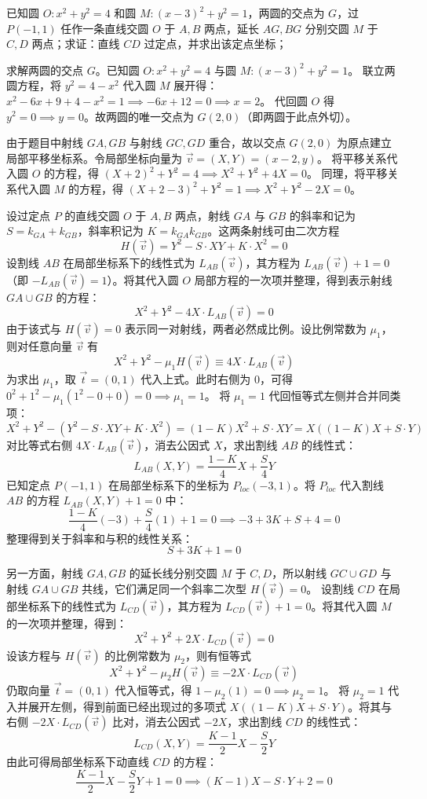 \begin{exercise}
    已知圆 \( O: x^2 + y^2 = 4 \) 和圆 \( M: (x-3)^2 + y^2 = 1 \)，两圆的交点为 \( G \)，过 \( P(-1,1) \) 任作一条直线交圆 \( O \) 于 \( A,B \) 两点，延长 \( AG,BG \) 分别交圆 \( M \) 于 \( C,D \) 两点；求证：直线 \( CD \) 过定点，并求出该定点坐标；
\end{exercise}
\begin{solution}
求解两圆的交点 $G$。已知圆 $O: x^2 + y^2 = 4$ 与圆 $M: (x-3)^2 + y^2 = 1$。
联立两圆方程，将 $y^2 = 4 - x^2$ 代入圆 $M$ 展开得：$x^2 - 6x + 9 + 4 - x^2 = 1 \implies -6x + 12 = 0 \implies x = 2$。
代回圆 $O$ 得 $y^2 = 0 \implies y = 0$。故两圆的唯一交点为 $G(2,0)$（即两圆于此点外切）。

由于题目中射线 $GA, GB$ 与射线 $GC, GD$ 重合，故以交点 $G(2,0)$ 为原点建立局部平移坐标系。令局部坐标向量为 $\vec{v} = (X, Y) = (x-2, y)$。
将平移关系代入圆 $O$ 的方程，得 $(X+2)^2 + Y^2 = 4 \implies X^2 + Y^2 + 4X = 0$。
同理，将平移关系代入圆 $M$ 的方程，得 $(X+2-3)^2 + Y^2 = 1 \implies X^2 + Y^2 - 2X = 0$。

设过定点 $P$ 的直线交圆 $O$ 于 $A, B$ 两点，射线 $GA$ 与 $GB$ 的斜率和记为 $S = k_{GA} + k_{GB}$，斜率积记为 $K = k_{GA} k_{GB}$。这两条射线可由二次方程
$$ H(\vec{v}) = Y^2 - S \cdot XY + K \cdot X^2 = 0 $$
设割线 $AB$ 在局部坐标系下的线性式为 $L_{AB}(\vec{v})$，其方程为 $L_{AB}(\vec{v}) + 1 = 0$（即 $-L_{AB}(\vec{v}) = 1$）。将其代入圆 $O$ 局部方程的一次项并整理，得到表示射线 $GA \cup GB$ 的方程：
$$ X^2 + Y^2 - 4X \cdot L_{AB}(\vec{v}) = 0 $$
由于该式与 $H(\vec{v}) = 0$ 表示同一对射线，两者必然成比例。设比例常数为 $\mu_1$，则对任意向量 $\vec{v}$ 有
$$ X^2 + Y^2 - \mu_1 H(\vec{v}) \equiv 4X \cdot L_{AB}(\vec{v}) $$
为求出 $\mu_1$，取 $\vec{t} = (0, 1)$ 代入上式。此时右侧为 $0$，可得 $0^2 + 1^2 - \mu_1(1^2 - 0 + 0) = 0 \implies \mu_1 = 1$。
将 $\mu_1 = 1$ 代回恒等式左侧并合并同类项：
$$ X^2 + Y^2 - (Y^2 - S \cdot XY + K \cdot X^2) = (1-K)X^2 + S \cdot XY = X((1-K)X + S \cdot Y) $$
对比等式右侧 $4X \cdot L_{AB}(\vec{v})$，消去公因式 $X$，求出割线 $AB$ 的线性式：
$$ L_{AB}(X, Y) = \frac{1-K}{4}X + \frac{S}{4}Y $$
已知定点 $P(-1,1)$ 在局部坐标系下的坐标为 $P_{loc}(-3, 1)$。将 $P_{loc}$ 代入割线 $AB$ 的方程 $L_{AB}(X,Y) + 1 = 0$ 中：
$$ \frac{1-K}{4}(-3) + \frac{S}{4}(1) + 1 = 0 \implies -3 + 3K + S + 4 = 0 $$
整理得到关于斜率和与积的线性关系：
$$ S + 3K + 1 = 0 $$

另一方面，射线 $GA, GB$ 的延长线分别交圆 $M$ 于 $C, D$，所以射线 $GC \cup GD$ 与射线 $GA \cup GB$ 共线，它们满足同一个斜率二次型 $H(\vec{v}) = 0$。
设割线 $CD$ 在局部坐标系下的线性式为 $L_{CD}(\vec{v})$，其方程为 $L_{CD}(\vec{v}) + 1 = 0$。将其代入圆 $M$ 的一次项并整理，得到：
$$ X^2 + Y^2 + 2X \cdot L_{CD}(\vec{v}) = 0 $$
设该方程与 $H(\vec{v})$ 的比例常数为 $\mu_2$，则有恒等式
$$ X^2 + Y^2 - \mu_2 H(\vec{v}) \equiv -2X \cdot L_{CD}(\vec{v}) $$
仍取向量 $\vec{t} = (0, 1)$ 代入恒等式，得 $1 - \mu_2(1) = 0 \implies \mu_2 = 1$。
将 $\mu_2 = 1$ 代入并展开左侧，得到前面已经出现过的多项式 $X((1-K)X + S \cdot Y)$。将其与右侧 $-2X \cdot L_{CD}(\vec{v})$ 比对，消去公因式 $-2X$，求出割线 $CD$ 的线性式：
$$ L_{CD}(X, Y) = \frac{K-1}{2}X - \frac{S}{2}Y $$
由此可得局部坐标系下动直线 $CD$ 的方程：
$$ \frac{K-1}{2}X - \frac{S}{2}Y + 1 = 0 \implies (K-1)X - S \cdot Y + 2 = 0 $$


\end{solution}
